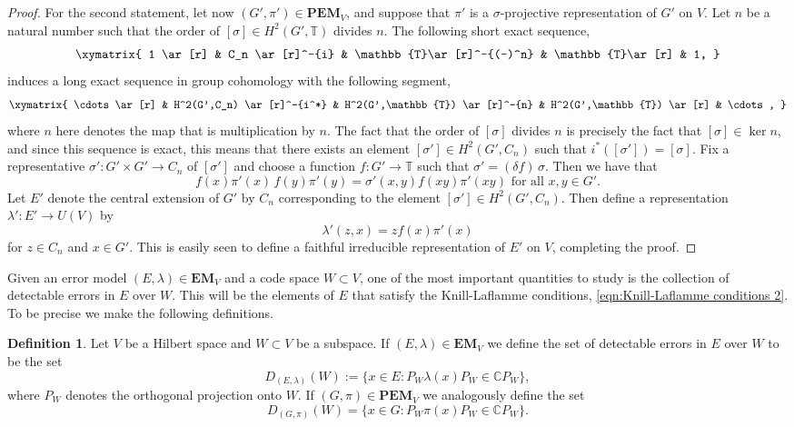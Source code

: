 \documentclass[11pt, oneside, reqno]{amsart}
\newcommand{\bbC}{\mathbb{C}}
\newcommand{\bbT}{\mathbb{T}}
\newcommand{\EM}{\mathbf{EM}}
\newcommand{\PEM}{\mathbf{PEM}}
\theoremstyle{definition}
\newtheorem{definition}{Definition}[section]
\theoremstyle{plain}
\theoremstyle{remark}
\begin{document}
\begin{proof}
    For the second statement, let now $(G',\pi') \in \PEM_V$, and suppose that $\pi'$ is a $\sigma$-projective representation of $G'$ on $V$. Let $n$ be a natural number such that the order of $[\sigma] \in H^2(G',\bbT)$ divides $n$. The following short exact sequence,
    \begin{equation*}
        \xymatrix{
            1 \ar[r] & C_n \ar[r]^-{i} & \bbT \ar[r]^-{(-)^n} & \bbT \ar[r] & 1,
        }
    \end{equation*}
    induces a long exact sequence in group cohomology with the following segment,
    \begin{equation*}
        \xymatrix{
            \cdots \ar[r] & H^2(G',C_n) \ar[r]^-{i^*} & H^2(G',\bbT) \ar[r]^-{n} & H^2(G',\bbT) \ar[r] & \cdots,
        }
    \end{equation*}
    where $n$ here denotes the map that is multiplication by $n$. The fact that the order of $[\sigma]$ divides $n$ is precisely the fact that $[\sigma] \in \ker{n}$, and since this sequence is exact, this means that there exists an element $[\sigma'] \in H^2(G',C_n)$ such that $i^*([\sigma']) = [\sigma]$. Fix a representative $\sigma' \colon G' \times G' \to C_n$ of $[\sigma']$ and choose a function $f \colon G' \to \bbT$ such that $\sigma' = (\delta f) \, \sigma$. Then we have that
    \begin{equation*}
        f(x)\pi'(x) \, f(y)\pi'(y) = \sigma'(x,y) f(xy)\pi'(xy) \text{ for all } x,y \in G'.
    \end{equation*}
    Let $E'$ denote the central extension of $G'$ by $C_n$ corresponding to the element $[\sigma'] \in H^2(G',C_n)$. Then define a representation $\lambda' \colon E' \to U(V)$ by
    \begin{equation*}
        \lambda'(z,x) = z f(x)\pi'(x)
    \end{equation*}
    for $z \in C_n$ and $x \in G'$. This is easily seen to define a faithful irreducible representation of $E'$ on $V$, completing the proof.
\end{proof}

Given an error model $(E,\lambda) \in \EM_V$ and a code space $W \subset V$, one of the most important quantities to study is the collection of detectable errors in $E$ over $W$. This will be the elements of $E$ that satisfy the Knill-Laflamme conditions, \cref{eqn:Knill-Laflamme conditions 2}. To be precise we make the following definitions.

\begin{definition}\label{def:detectable errors}
    Let $V$ be a Hilbert space and $W \subset V$ be a subspace. If $(E,\lambda) \in \EM_V$ we define the set of detectable errors in $E$ over $W$ to be the set
    \begin{equation*}
        D_{(E,\lambda)}(W) := \{ x \in E \colon P_W \lambda(x) P_W \in \bbC P_W \},
    \end{equation*}
    where $P_W$ denotes the orthogonal projection onto $W$. If $(G,\pi) \in \PEM_V$ we analogously define the set
    \begin{equation*}
        D_{(G,\pi)}(W) = \{ x \in G \colon P_W \pi(x) P_W \in \bbC P_W \}.
    \end{equation*}
\end{definition}
\end{document}
